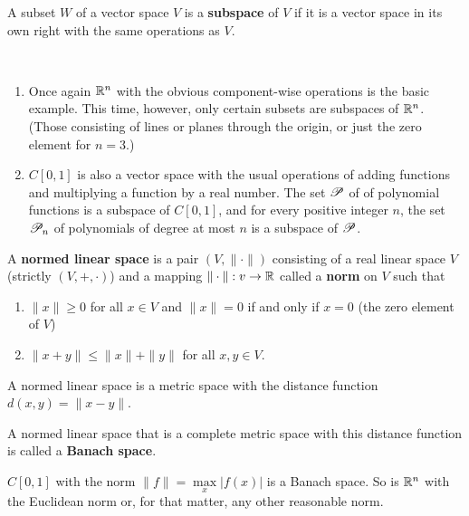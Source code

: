 \begin{defn}%
	A subset $W$ of a vector space $V$ is a \textbf{subspace} of $V$ if it is a 
	vector space in its own right with the same operations as $V$. 
\end{defn}

\begin{ex}~ %
	\begin{enumerate}
	\item Once again $\mathbb{R}^n$ with the obvious component-wise operations is the 
		basic example. This time, however, only certain subsets are subspaces 
		of $\mathbb{R}^n$. (Those consisting of lines or planes through the origin, or 
		just the zero element for $n = 3$.)
	\item $C[0,1]$ is also a vector space with the usual operations of adding functions 
		and multiplying a function by a real number. The set $\mathscr{P}$ of of polynomial 
		functions is a subspace of $C[0,1]$, and for every positive integer $n$, 
		the set $\mathscr{P}_n$ of polynomials of degree at most $n$ is a subspace of $\mathscr{P}$.  
	\end{enumerate}
\end{ex}

\begin{defn}%
	A \textbf{normed linear space} is a pair $(V, \|\cdot\|)$ consisting of a real 
	linear space $V$ (strictly $(V,+,\cdot)$) and a mapping $\|\cdot\|:v\rightarrow \mathbb{R}$ 
	called a \textbf{norm} on $V$ such that 
	\begin{enumerate}
	\item $\|x\|\ge 0$ for all $x\in V$ and $\|x\|=0$ if and only if $x = 0$ (the zero 
		element of $V$)
	\item $\|x+y\|\le\|x\|+\|y\|$ for all $x,y\in V$. 
	\end{enumerate}
\end{defn}

\begin{rmk} %
	A normed linear space is a metric space with the distance function $d(x,y) = \|x-y\|$. 
\end{rmk}

\begin{defn}%
	A normed linear space that is a complete metric space with this distance function is 
	called a \textbf{Banach space}. 
\end{defn}

\begin{ex}%
	$C[0,1]$ with the norm $\|f\|=\max\limits_{x}|f(x)|$ is a Banach space. So is $\mathbb{R}^n$ 
	with the Euclidean norm or, for that matter, any other reasonable norm. 
\end{ex}

